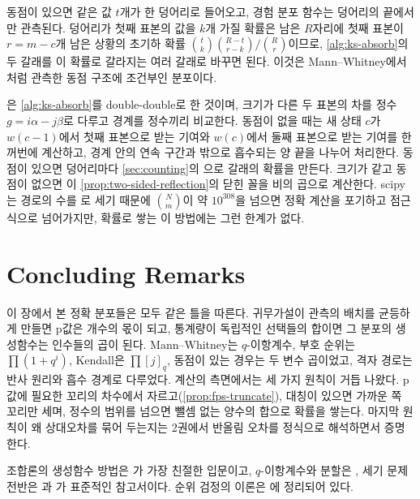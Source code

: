 동점이 있으면 같은 값 $t$개가 한 덩어리로 들어오고, 경험 분포 함수는 덩어리의 끝에서만 관측된다. 덩어리가 첫째 표본의 값을 $k$개 가질 확률은 남은 $R$자리에 첫째 표본이 $r=m-c$개 남은 상황의 초기하 확률 $\binom tk\binom{R-t}{r-k}/\binom Rr$이므로, \cref{alg:ks-absorb}의 두 갈래를 이 확률로 갈라지는 여러 갈래로 바꾸면 된다. 이것은 Mann--Whitney에서처럼 관측한 동점 구조에 조건부인 분포이다.

\begin{instardust}
은 \cref{alg:ks-absorb}를 double-double로 한 것이며, 크기가 다른 두 표본의 차를 정수 $g=i\alpha-j\beta$로 다루고 경계를 정수끼리 비교한다. 동점이 없을 때는 새 상태 $c$가 $w(c-1)$에서 첫째 표본으로 받는 기여와 $w(c)$에서 둘째 표본으로 받는 기여를 한꺼번에 계산하고, 경계 안의 연속 구간과 밖으로 흡수되는 양 끝을 나누어 처리한다. 동점이 있으면 덩어리마다 \cref{sec:counting}의 으로 갈래의 확률을 만든다. 크기가 같고 동점이 없으면 이 \cref{prop:two-sided-reflection}의 닫힌 꼴을 비의 곱으로 계산한다. scipy는 경로의 수를 로 세기 때문에 $\binom Nm$이 약 $10^{308}$을 넘으면 정확 계산을 포기하고 점근식으로 넘어가지만, 확률로 쌓는 이 방법에는 그런 한계가 없다.
\end{instardust}

\section{Concluding Remarks}

이 장에서 본 정확 분포들은 모두 같은 틀을 따른다. 귀무가설이 관측의 배치를 균등하게 만들면 p값은 개수의 몫이 되고, 통계량이 독립적인 선택들의 합이면 그 분포의 생성함수는 인수들의 곱이 된다. Mann--Whitney는 $q$-이항계수, 부호 순위는 $\prod(1+q^i)$, Kendall은 $\prod[j]_q$, 동점이 있는 경우는 두 변수 곱이었고, 격자 경로는 반사 원리와 흡수 경계로 다루었다. 계산의 측면에서는 세 가지 원칙이 거듭 나왔다. p값에 필요한 꼬리의 차수에서 자르고(\cref{prop:fps-truncate}), 대칭이 있으면 가까운 쪽 꼬리만 세며, 정수의 범위를 넘으면 뺄셈 없는 양수의 합으로 확률을 쌓는다. 마지막 원칙이 왜 상대오차를 묶어 두는지는 2권에서 반올림 오차를 정식으로 해석하면서 증명한다.

조합론의 생성함수 방법은 \cite{wilf2006gf}가 가장 친절한 입문이고, $q$-이항계수와 분할은 \cite{andrews1998partitions}, 세기 문제 전반은 \cite{stanley2012ec1}과 \cite{flajolet2009analytic}가 표준적인 참고서이다. 순위 검정의 이론은 \cite{hajek1999rank}에 정리되어 있다.

\chapterreferences
